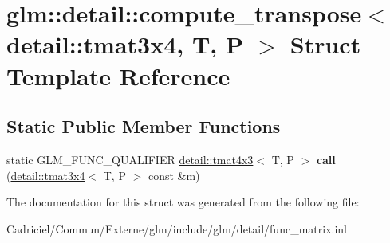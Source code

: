 \hypertarget{structglm_1_1detail_1_1compute__transpose_3_01detail_1_1tmat3x4_00_01_t_00_01_p_01_4}{}\section{glm\+:\+:detail\+:\+:compute\+\_\+transpose$<$ detail\+:\+:tmat3x4, T, P $>$ Struct Template Reference}
\label{structglm_1_1detail_1_1compute__transpose_3_01detail_1_1tmat3x4_00_01_t_00_01_p_01_4}
\subsection*{Static Public Member Functions}
\begin{DoxyCompactItemize}
\item 
static G\+L\+M\+\_\+\+F\+U\+N\+C\+\_\+\+Q\+U\+A\+L\+I\+F\+I\+ER \hyperlink{structglm_1_1detail_1_1tmat4x3}{detail\+::tmat4x3}$<$ T, P $>$ {\bfseries call} (\hyperlink{structglm_1_1detail_1_1tmat3x4}{detail\+::tmat3x4}$<$ T, P $>$ const \&m)\hypertarget{structglm_1_1detail_1_1compute__transpose_3_01detail_1_1tmat3x4_00_01_t_00_01_p_01_4_a1cd1f07ec6c02b790e15ae86c40fb5b0}{}\label{structglm_1_1detail_1_1compute__transpose_3_01detail_1_1tmat3x4_00_01_t_00_01_p_01_4_a1cd1f07ec6c02b790e15ae86c40fb5b0}

\end{DoxyCompactItemize}


The documentation for this struct was generated from the following file\+:\begin{DoxyCompactItemize}
\item 
Cadriciel/\+Commun/\+Externe/glm/include/glm/detail/func\+\_\+matrix.\+inl\end{DoxyCompactItemize}
